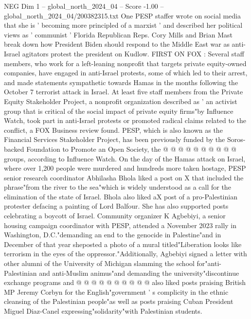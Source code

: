 \begin{textsample}{NEG Dim 1 – global\_north\_2024\_04 – Score -1.00 – global\_north\_2024\_04/200382315.txt}  \label{ex:f1_neg_249}
One PESP staffer wrote on social media that she is ' becoming more principled of a marxist ' and described her political views as ' communist ' Florida Republican Reps.
Cory Mills and Brian Mast break down how President Biden should respond to the Middle East war as anti-Israel agitators protest the president on Kudlow.
FIRST ON FOX : Several staff members, who work for a left-leaning nonprofit that targets private equity-owned companies, have engaged in anti-Israel protests, some of which led to their arrest, and made statements sympathetic towards Hamas in the months following the October 7 terrorist attack in Israel.
At least five staff members from the Private Equity Stakeholder Project, a nonprofit organization described as ' an activist group that is critical of the social impact of private equity firms"by Influence Watch, took part in anti-Israel protests or promoted radical claims related to the conflict, a FOX Business review found.
PESP, which is also known as the Financial Services Stakeholder Project, has been previously funded by the Soros-backed Foundation to Promote an Open Society, the @ @ @ @ @ @ @ @ @ @ groups, according to Influence Watch.
On the day of the Hamas attack on Israel, where over 1,200 people were murdered and hundreds more taken hostage, PESP senior research coordinator Abhilasha Bhola liked a post on X that included the phrase"from the river to the sea"which is widely understood as a call for the elimination of the state of Israel.
Bhola also liked aX post of a pro-Palestinian protester defacing a painting of Lord Balfour.
She has also supported posts celebrating a boycott of Israel.
Community organizer K Agbebiyi, a senior housing campaign coordinator with PESP, attended a November 2023 rally in Washington, D.C."demanding an end to the genocide in Palestine"and in December of that year sheposted a photo of a mural titled"Liberation looks like terrorism in the eyes of the oppressor."Additionally, Agbebiyi signed a letter with other alumni of the University of Michigan slamming the school for"anti-Palestinian and anti-Muslim animus"and demanding the university"discontinue exchange programs and @ @ @ @ @ @ @ @ @ @ also liked posts praising British MP Jeremy Corbyn for the English"government ' s complicity in the ethnic cleansing of the Palestinian people"as well as posts praising Cuban President Miguel Diaz-Canel expressing"solidarity"with Palestinian students.

\end{textsample}
